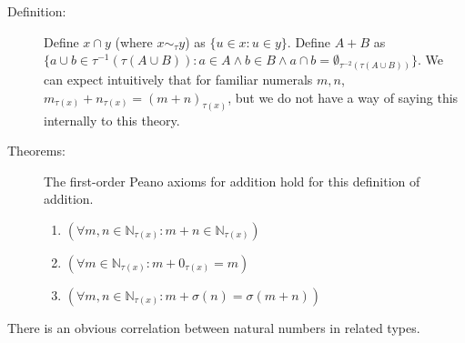 \documentclass[12pt]{article}
\begin{document}
\begin{description}

\item[Definition:]  Define $x \cap y$ (where $x \sim_\tau y$) as $\{u \in x:u \in y\}$.  Define $A + B$ as $\{a \cup b \in \tau^{-1}(\tau(A\cup B)):a \in A \wedge b \in B \wedge a \cap b = \emptyset_{\tau^{-2}(\tau(A \cup B))}\}$.  We can expect intuitively that for familiar numerals $m,n$, $m_{\tau(x)} + n_{\tau(x)} = (m+n)_{\tau(x)}$, but we do not have a way of saying this internally to this theory.



\item[Theorems:]  The first-order Peano axioms for addition hold for this definition of addition.

\begin{enumerate}

\item $(\forall m,n \in \mathbb N_{\tau(x)}:m+n \in \mathbb N_{\tau(x)})$

\item $(\forall m \in \mathbb N_{\tau(x)}:m+0_{\tau(x)} = m)$

\item $(\forall m,n \in \mathbb N_{\tau(x)}:m+\sigma(n) = \sigma(m+n))$

\end{enumerate}

\end{description}

There is an obvious correlation between natural numbers in related types.
\end{document}
